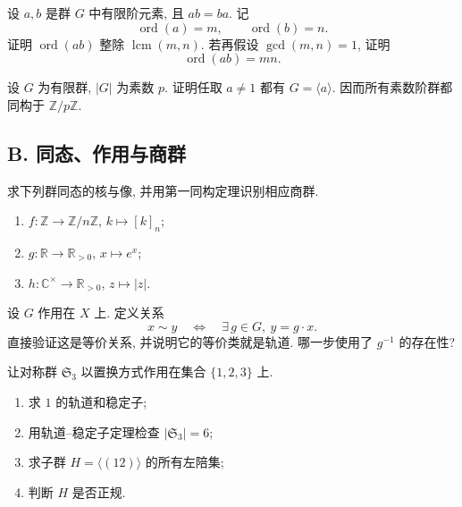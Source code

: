 \documentclass[usesamecnt, thmcnt=section, lang=cn, newtx, 10pt, scheme=chinese]{elegantbook}
\begin{document}
\begin{exercise}\label{ex:alg-end-04}
设 $a,b$ 是群 $G$ 中有限阶元素, 且 $ab=ba$. 记
\[
 \operatorname{ord}(a)=m,
 \qquad
 \operatorname{ord}(b)=n.
\]
证明 $\operatorname{ord}(ab)$ 整除 $\operatorname{lcm}(m,n)$. 若再假设 $\gcd(m,n)=1$, 证明
\[
 \operatorname{ord}(ab)=mn.
\]
\end{exercise}

\begin{exercise}\label{ex:alg-end-05}
设 $G$ 为有限群, $|G|$ 为素数 $p$. 证明任取 $a\neq1$ 都有 $G=\langle a\rangle$. 因而所有素数阶群都同构于 $\mathbb Z/p\mathbb Z$.
\end{exercise}

\subsection*{B. 同态、作用与商群}

\begin{exercise}\label{ex:alg-end-06}
求下列群同态的核与像, 并用第一同构定理识别相应商群.
\begin{enumerate}[label=\rm(\arabic*)]
  \item $f:\mathbb Z\to\mathbb Z/n\mathbb Z$, $k\mapsto [k]_n$;
  \item $g:\mathbb R\to\mathbb R_{>0}$, $x\mapsto e^x$;
  \item $h:\mathbb C^\times\to\mathbb R_{>0}$, $z\mapsto|z|$.
\end{enumerate}
\end{exercise}

\begin{exercise}\label{ex:alg-end-07}
设 $G$ 作用在 $X$ 上. 定义关系
\[
 x\sim y
 \quad\Longleftrightarrow\quad
 \exists\,g\in G,\ y=g\cdot x.
\]
直接验证这是等价关系, 并说明它的等价类就是轨道. 哪一步使用了 $g^{-1}$ 的存在性?
\end{exercise}

\begin{exercise}\label{ex:alg-end-08}
让对称群 $\mathfrak S_3$ 以置换方式作用在集合 $\{1,2,3\}$ 上.
\begin{enumerate}[label=\rm(\arabic*)]
  \item 求 $1$ 的轨道和稳定子;
  \item 用轨道--稳定子定理检查 $|\mathfrak S_3|=6$;
  \item 求子群 $H=\langle(12)\rangle$ 的所有左陪集;
  \item 判断 $H$ 是否正规.
\end{enumerate}
\end{exercise}
\end{document}
